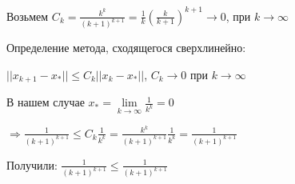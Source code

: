 \documentclass[]{article}
\title{}
\author{}
\begin{document}
\maketitle


Возьмем $C_k = \frac{k^k}{(k+1)^{k+1}} = \frac{1}{k}\left(\frac{k}{k+1}\right)^{k+1} \rightarrow 0$, при $k \rightarrow \infty$

Определение метода, сходящегося сверхлинейно:

$||x_{k+1} - x_*|| \le C_k||x_{k} - x_*||$, $C_k \rightarrow 0$ при $k \rightarrow \infty$

В нашем случае $x_* = \lim\limits_{k \to \infty} \frac{1}{k^k} = 0$

$\Rightarrow \frac{1}{(k+1)^{k+1}} \le C_k \frac{1}{k^k} = \frac{k^k}{(k+1)^{k+1}} \frac{1}{k^k} = \frac{1}{(k+1)^{k+1}}$

Получили:
$\frac{1}{(k+1)^{k+1}} \le \frac{1}{(k+1)^{k+1}}$
\end{document}

